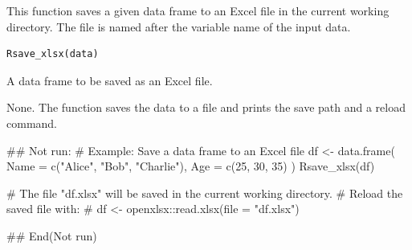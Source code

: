 \documentclass[a4paper]{book}
\begin{document}
%
\begin{Description}
This function saves a given data frame to an Excel file in the current working directory.
The file is named after the variable name of the input data.
\end{Description}
%
\begin{Usage}
\begin{verbatim}
Rsave_xlsx(data)
\end{verbatim}
\end{Usage}
%
\begin{Arguments}
\begin{ldescription}
\item[\code{data}] A data frame to be saved as an Excel file.
\end{ldescription}
\end{Arguments}
%
\begin{Value}
None. The function saves the data to a file and prints the save path and a reload command.
\end{Value}
%
\begin{Examples}
\begin{ExampleCode}
\#\# Not run: 
# Example: Save a data frame to an Excel file
df <- data.frame(
  Name = c("Alice", "Bob", "Charlie"),
  Age = c(25, 30, 35)
)
Rsave_xlsx(df)

# The file "df.xlsx" will be saved in the current working directory.
# Reload the saved file with:
# df <- openxlsx::read.xlsx(file = "df.xlsx")

## End(Not run)
\end{ExampleCode}
\end{Examples}
\end{document}
